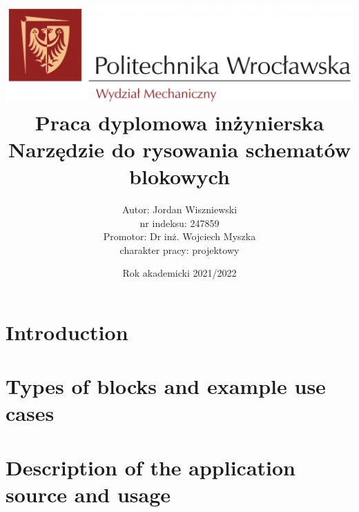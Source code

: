 \documentclass[12pt,a4paper]{report}
\author{
	{Autor: Jordan Wiszniewski}\\
	{nr indeksu: 247859}\\
	{Promotor: Dr inż. Wojciech Myszka}\\
	{charakter pracy: projektowy}
}
\date{Rok akademicki 2021/2022}
\title{
	{\includegraphics[width = \textwidth]{logo-pwr-wm.png}}
	{\bigbreak}
	{Praca dyplomowa inżynierska}\\
	{\bigbreak}
	\textbf{Narzędzie do rysowania schematów blokowych}
}
\begin{document}
\maketitle
\tableofcontents

\chapter{Introduction}


\chapter{Types of blocks and example use cases}


\chapter{Description of the application source and usage}

\end{document}

